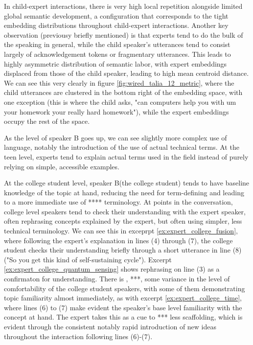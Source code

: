 \documentclass{article}
\theoremstyle{definition}
\newcounter{excerpt}
\numberwithin{table}{section}
\begin{document}
In child-expert interactions, there is very high local repetition alongside limited global semantic development, a configuration that corresponds to the tight embedding distributions throughout child-expert interactions. 
Another key observation (previousy briefly mentioned) is that experts tend to do the bulk of the speaking in general, while the child speaker's utterances tend to consist largely of acknowledgement tokens or fragmentary utterances. This leads to highly asymmetric distribution of semantic labor, with expert embeddings displaced from those of the child speaker, leading to high mean centroid distance. We can see this very clearly in figure \ref{fig:wired_talia_12_metric}, where the child utterances are clustered in the bottom right of the embedding space, with one exception (this is where the child asks, "can computers help you with um your homework your really hard homework"), while the expert embeddings occupy the rest of the space. 

As the level of speaker B goes up, we can see slightly more complex use of language, notably the introduction of the use of actual technical terms. At the teen level, experts tend to explain actual terms used in the field instead of purely relying on simple, accessible examples. 


At the college student level, speaker B(the college student) tends to have baseline knowledge of the topic at hand, reducing the need for term-defining and leading to a more immediate use of **** terminology. At points in the conversation, college level speakers tend to check their understanding with the expert speaker, often rephrasing concepts explained by the expert, but often using simpler, less technical terminology. We can see this in exceprpt \ref{ex:expert_college_fusion}, where following the expert's explanation in lines (4) through (7), the college student checks their understanding briefly through a short utterance in line (8) ("So you get this kind of self-sustaining cycle"). Excerpt \ref{ex:expert_college_quantum_sensing} shows rephrasing on line (3) as a confirmaton for understanding. There is , ***, some variance in the level of comfortability of the college student speakers, with some of them demonstrating topic familiarity almost immediately, as with excerpt \ref{ex:expert_college_time}, where lines (6) to (7) make evident the speaker's base level familiarity with the concept at hand. The expert takes this as a cue to *** less scaffolding, which is evident through the consistent notably rapid introduction of new ideas throughout the interaction following lines (6)-(7).  
\end{document}
